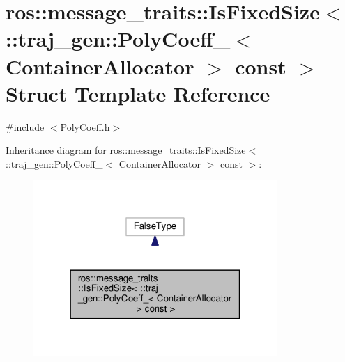 \hypertarget{structros_1_1message__traits_1_1_is_fixed_size_3_01_1_1traj__gen_1_1_poly_coeff___3_01_container_allocator_01_4_01const_01_01_4}{}\section{ros\+:\+:message\+\_\+traits\+:\+:Is\+Fixed\+Size$<$ \+:\+:traj\+\_\+gen\+:\+:Poly\+Coeff\+\_\+$<$ Container\+Allocator $>$ const $>$ Struct Template Reference}
\label{structros_1_1message__traits_1_1_is_fixed_size_3_01_1_1traj__gen_1_1_poly_coeff___3_01_container_allocator_01_4_01const_01_01_4}


{\ttfamily \#include $<$Poly\+Coeff.\+h$>$}



Inheritance diagram for ros\+:\+:message\+\_\+traits\+:\+:Is\+Fixed\+Size$<$ \+:\+:traj\+\_\+gen\+:\+:Poly\+Coeff\+\_\+$<$ Container\+Allocator $>$ const $>$\+:
\nopagebreak
\begin{figure}[H]
\begin{center}
\leavevmode
\includegraphics[width=262pt]{structros_1_1message__traits_1_1_is_fixed_size_3_01_1_1traj__gen_1_1_poly_coeff___3_01_container85a4e372542c322523784d8a4d5c7075}
\end{center}
\end{figure}


